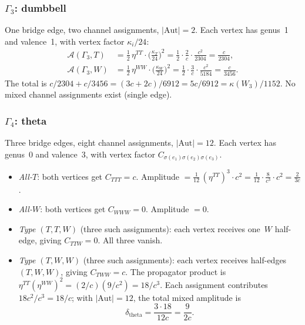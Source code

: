 \subsubsection*{$\Gamma_3$: dumbbell}

One bridge edge, two channel assignments, $|\mathrm{Aut}| = 2$.
Each vertex has genus~1 and valence~1, with vertex factor
$\kappa_i/24$:
\begin{align}
\mathcal{A}(\Gamma_3, T) &=
 \tfrac{1}{2}\, \eta^{TT} \cdot
 \bigl(\tfrac{\kappa_T}{24}\bigr)^2
 = \tfrac{1}{2} \cdot \tfrac{2}{c} \cdot \tfrac{c^2}{2304}
 = \frac{c}{2304}, \label{eq:dumbbell-T}\\
\mathcal{A}(\Gamma_3, W) &=
 \tfrac{1}{2}\, \eta^{WW} \cdot
 \bigl(\tfrac{\kappa_W}{24}\bigr)^2
 = \tfrac{1}{2} \cdot \tfrac{3}{c} \cdot \tfrac{c^2}{5184}
 = \frac{c}{3456}. \label{eq:dumbbell-W}
\end{align}
The total is $c/2304 + c/3456 = (3c + 2c)/6912 = 5c/6912 =
\kappa(W_3)/1152$. No mixed channel assignments exist (single edge).

\subsubsection*{$\Gamma_4$: theta}

Three bridge edges, eight channel assignments, $|\mathrm{Aut}| = 12$.
Each vertex has genus~0 and valence~3, with vertex factor
$C_{\sigma(e_1)\sigma(e_2)\sigma(e_3)}$.
\begin{itemize}
\item \emph{All-$T$}: both vertices get $C_{TTT} = c$.
 Amplitude $= \frac{1}{12}\, (\eta^{TT})^3 \cdot c^2
 = \frac{1}{12} \cdot \frac{8}{c^3} \cdot c^2
 = \frac{2}{3c}$.

\item \emph{All-$W$}: both vertices get $C_{WWW} = 0$.
 Amplitude $= 0$.

\item \emph{Type $(T,T,W)$} (three such assignments):
 each vertex receives one~$W$ half-edge, giving $C_{TTW} = 0$.
 All three vanish.

\item \emph{Type $(T,W,W)$} (three such assignments):
 each vertex receives half-edges $(T,W,W)$, giving
 $C_{TWW} = c$. The propagator product is
 $\eta^{TT} (\eta^{WW})^2 = (2/c)(9/c^2) = 18/c^3$.
 Each assignment contributes $18c^2/c^3 = 18/c$; with
 $|\mathrm{Aut}| = 12$, the total mixed amplitude is
 \begin{equation}\label{eq:theta-mixed}
 \delta_{\mathrm{theta}} = \frac{3 \cdot 18}{12c}
 = \frac{9}{2c}.
 \end{equation}
\end{itemize}

